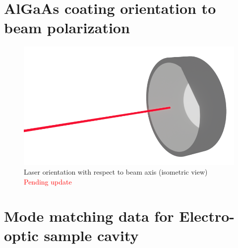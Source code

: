 
\section{AlGaAs coating orientation to beam polarization}

\begin{figure}[H]
\includegraphics[width=\textwidth]{figs/ALGAAS/laser_mirror_test2.png}
\caption{Laser orientation with respect to beam axis (isometric view) \textcolor{red}{Pending update}}
\label{fig:macor_mount_design}
\end{figure}


\section{Mode matching data for Electro-optic sample cavity}
